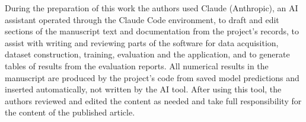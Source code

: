 During the preparation of this work the authors used Claude (Anthropic), an AI assistant operated through the Claude Code environment, to draft and edit sections of the manuscript text and documentation from the project's records, to assist with writing and reviewing parts of the software for data acquisition, dataset construction, training, evaluation and the application, and to generate tables of results from the evaluation reports. All numerical results in the manuscript are produced by the project's code from saved model predictions and inserted automatically, not written by the AI tool. After using this tool, the authors reviewed and edited the content as needed and take full responsibility for the content of the published article.
